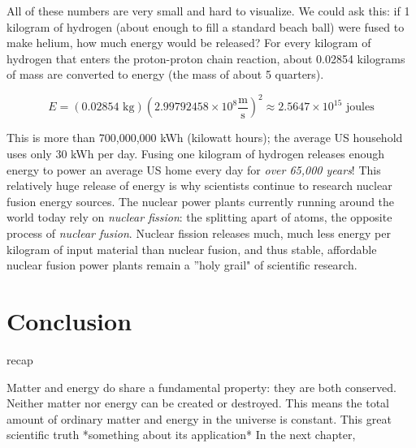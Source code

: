 All of these numbers are very small and hard to visualize. We could ask this: if 
1 kilogram of hydrogen (about enough to fill a standard beach ball) were fused to 
make helium, how much energy would be released? For every kilogram of hydrogen 
that enters the proton-proton chain reaction, about 0.02854 kilograms of mass are 
converted to energy (the mass of about 5 quarters).

$$E = \left( 0.02854 \text{ kg} \right) \left( 2.99792458 \times 10^8 \frac{
\text{m}}{\text{s}} \right)^2 \approx 2.5647 \times 10^{15} \text{ joules}$$

This is more than 700,000,000 kWh (kilowatt hours); the average US household 
uses only 30 kWh per day. Fusing one kilogram of hydrogen releases enough energy 
to power an average US home every day for \textit{over 65,000 years}! This 
relatively huge release of energy is why scientists continue to research nuclear 
fusion energy sources. The nuclear power plants currently running around the world 
today rely on \textit{nuclear fission}: the splitting apart of atoms, the opposite 
process of \textit{nuclear fusion}. Nuclear fission releases much, much less energy 
per kilogram of input material than nuclear fusion, and thus stable, affordable 
nuclear fusion power plants remain a ''holy grail" of scientific research. 

\section{Conclusion}
recap

Matter and energy do share a fundamental property: they are both conserved. Neither matter nor energy can be created or destroyed. This means the total amount of ordinary matter and energy in the universe is constant. This great scientific truth *something about its application* In the next chapter, 










